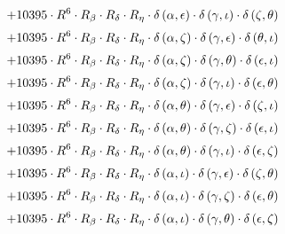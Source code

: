 \begin{subequations}
\begin{gather}
 \\[0.2em] \notag 		 + 10395 \cdot R^{6} \cdot R_{\beta{}} \cdot R_{\delta{}} \cdot R_{\eta{}} \cdot \delta{}\left(\alpha{}, \epsilon{}\right) \cdot \delta{}\left(\gamma{}, \iota{}\right) \cdot \delta{}\left(\zeta{}, \theta{}\right) 
 \\[0.2em] \notag 		 + 10395 \cdot R^{6} \cdot R_{\beta{}} \cdot R_{\delta{}} \cdot R_{\eta{}} \cdot \delta{}\left(\alpha{}, \zeta{}\right) \cdot \delta{}\left(\gamma{}, \epsilon{}\right) \cdot \delta{}\left(\theta{}, \iota{}\right) 
 \\[0.2em] \notag 		 + 10395 \cdot R^{6} \cdot R_{\beta{}} \cdot R_{\delta{}} \cdot R_{\eta{}} \cdot \delta{}\left(\alpha{}, \zeta{}\right) \cdot \delta{}\left(\gamma{}, \theta{}\right) \cdot \delta{}\left(\epsilon{}, \iota{}\right) 
 \\[0.2em] \notag 		 + 10395 \cdot R^{6} \cdot R_{\beta{}} \cdot R_{\delta{}} \cdot R_{\eta{}} \cdot \delta{}\left(\alpha{}, \zeta{}\right) \cdot \delta{}\left(\gamma{}, \iota{}\right) \cdot \delta{}\left(\epsilon{}, \theta{}\right) 
 \\[0.2em] \notag 		 + 10395 \cdot R^{6} \cdot R_{\beta{}} \cdot R_{\delta{}} \cdot R_{\eta{}} \cdot \delta{}\left(\alpha{}, \theta{}\right) \cdot \delta{}\left(\gamma{}, \epsilon{}\right) \cdot \delta{}\left(\zeta{}, \iota{}\right) 
 \\[0.2em] \notag 		 + 10395 \cdot R^{6} \cdot R_{\beta{}} \cdot R_{\delta{}} \cdot R_{\eta{}} \cdot \delta{}\left(\alpha{}, \theta{}\right) \cdot \delta{}\left(\gamma{}, \zeta{}\right) \cdot \delta{}\left(\epsilon{}, \iota{}\right) 
 \\[0.2em] \notag 		 + 10395 \cdot R^{6} \cdot R_{\beta{}} \cdot R_{\delta{}} \cdot R_{\eta{}} \cdot \delta{}\left(\alpha{}, \theta{}\right) \cdot \delta{}\left(\gamma{}, \iota{}\right) \cdot \delta{}\left(\epsilon{}, \zeta{}\right) 
 \\[0.2em] \notag 		 + 10395 \cdot R^{6} \cdot R_{\beta{}} \cdot R_{\delta{}} \cdot R_{\eta{}} \cdot \delta{}\left(\alpha{}, \iota{}\right) \cdot \delta{}\left(\gamma{}, \epsilon{}\right) \cdot \delta{}\left(\zeta{}, \theta{}\right) 
 \\[0.2em] \notag 		 + 10395 \cdot R^{6} \cdot R_{\beta{}} \cdot R_{\delta{}} \cdot R_{\eta{}} \cdot \delta{}\left(\alpha{}, \iota{}\right) \cdot \delta{}\left(\gamma{}, \zeta{}\right) \cdot \delta{}\left(\epsilon{}, \theta{}\right) 
 \\[0.2em] \notag 		 + 10395 \cdot R^{6} \cdot R_{\beta{}} \cdot R_{\delta{}} \cdot R_{\eta{}} \cdot \delta{}\left(\alpha{}, \iota{}\right) \cdot \delta{}\left(\gamma{}, \theta{}\right) \cdot \delta{}\left(\epsilon{}, \zeta{}\right) 

\end{gather}
\end{subequations}
